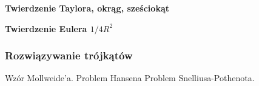 \textbf{Twierdzenie Taylora, okrąg, sześciokąt}

\textbf{Twierdzenie Eulera $1/4R^2$}


\subsubsection{Rozwiązywanie trójkątów}
Wzór Mollweide'a.
%
Problem Hansena
%
Problem Snelliusa-Pothenota.
%

